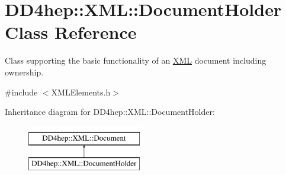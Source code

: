 \hypertarget{class_d_d4hep_1_1_x_m_l_1_1_document_holder}{}\section{D\+D4hep\+:\+:X\+ML\+:\+:Document\+Holder Class Reference}
\label{class_d_d4hep_1_1_x_m_l_1_1_document_holder}


Class supporting the basic functionality of an \hyperlink{namespace_d_d4hep_1_1_x_m_l}{X\+ML} document including ownership.  




{\ttfamily \#include $<$X\+M\+L\+Elements.\+h$>$}

Inheritance diagram for D\+D4hep\+:\+:X\+ML\+:\+:Document\+Holder\+:\begin{figure}[H]
\begin{center}
\leavevmode
\includegraphics[height=2.000000cm]{class_d_d4hep_1_1_x_m_l_1_1_document_holder}
\end{center}
\end{figure}
